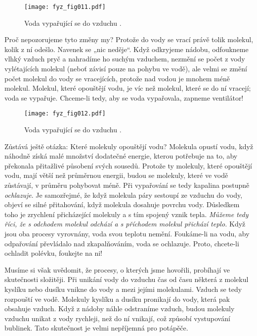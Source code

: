 {      \begin{wrapfigure}[14]{r}{5cm}   %
        \centering
        \texttt{[image: fyz\_fig011.pdf]}
        \caption{Voda vypařující se do vzduchu \cite[s.~21]{Feynman01}.}
        \label{fyz:fig_011}
      \end{wrapfigure}
      Proč nepozorujeme tyto změny my? Protože do vody se vrací právě tolik molekul, kolik z ní 
      odešlo. Navenek se „nic neděje“. Když odkryjeme nádobu, odfoukneme vlhký vzduch pryč a 
      nahradíme ho suchým vzduchem, nezmění se počet z vody vylétajících molekul (neboť závisí 
      pouze na pohybu ve vodě), ale velmi se změní počet molekul do vody se vracejících, protože 
      nad vodou je mnohem méně molekul. Molekul, které opouštějí vodu, je víc než molekul, které se 
      do ní vracejí; voda se vypařuje. Chceme-li tedy, aby se voda vypařovala, zapneme ventilátor!
      
      \begin{wrapfigure}[15]{r}{5cm}   %
        \centering
        \texttt{[image: fyz\_fig012.pdf]}
        \caption{Voda vypařující se do vzduchu \cite[s.~21]{Feynman01}.}
        \label{fyz:fig_012}
      \end{wrapfigure}
      Zůstává ještě otázka: Které molekuly opouštějí vodu? Molekula opustí vodu, když náhodně získá 
      malé množství dodatečné energie, kterou potřebuje na to, aby překonala přitažlivé působení 
      svých sousedů. Protože ty molekuly, které opouštějí vodu, mají větší než průměrnou energii, 
      budou se molekuly, které ve vodě zůstávají, v průměru pohybovat méně. Při vypařování se tedy 
      kapalina postupně \emph{ochlazuje}. Je samozřejmé, že když molekula páry sestoupí ze vzduchu 
      do vody, objeví se silné přitahování, když molekula dosahuje povrchu vody. Důsledkem toho je 
      zrychlení přicházející molekuly a s tím spojený vznik tepla. \emph{Můžeme tedy říci, že s 
      odchodem molekul odchází a s příchodem molekul přichází teplo.} Když jsou oba procesy 
      vyrovnány, voda svou teplotu nemění. Foukáme-li na vodu, aby odpařování převládalo nad 
      zkapalňováním, voda se ochlazuje. Proto, chcete-li ochladit polévku, foukejte na ni!
      
      Musíme si však uvědomit, že procesy, o kterých jsme hovořili, probíhají ve skutečnosti 
      složitěji. Při unikání vody do vzduchu čas od času některá z molekul kyslíku nebo dusíku 
      vnikne do vody a  mezi jejími molekulami. Vzduch se tedy rozpouští ve vodě. 
      Molekuly kyslíku a dusíku pronikají do vody, která pak obsahuje vzduch. Když z nádoby náhle 
      odstraníme vzduch, budou molekuly vzduchu unikat z vody rychleji, než do ní vnikají, což 
      způsobí vystupování bublinek. Tato skutečnost je velmi nepříjemná pro potápěče.

}
